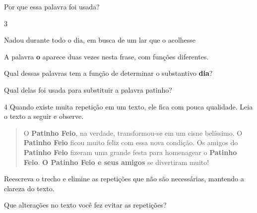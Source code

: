 \begin{escolha}
\begin{escolha}
\begin{escolha}
\item Por que essa palavra foi usada?

\end{escolha}


\num{3}

\begin{mdframed}[linewidth=10pt,linecolor=salmao!20,backgroundcolor=salmao!20,roundcorner=20pt]
Nadou durante todo o dia, em busca de um lar que o acolhesse
\end{mdframed}

A palavra \textbf{o} aparece duas vezes nesta frase, com funções diferentes.

\begin{escolha}
\item Qual dessas palavras tem a função de determinar o substantivo \textbf{dia}?



\item Qual delas foi usada para substituir a palavra patinho?

\end{escolha}


\num{4} Quando existe muita repetição em um texto, ele fica com pouca qualidade.
Leia o texto a seguir e observe.

\begin{quote}
O \textbf{Patinho Feio}, na verdade, transformou-se em um cisne
belíssimo. O \textbf{Patinho Feio} ficou muito feliz com essa nova
condição. Os amigos do \textbf{Patinho Feio} fizeram uma grande festa
para homenagear o \textbf{Patinho Feio}. \textbf{O Patinho Feio e seus
amigos} se divertiram muito!
\end{quote}

\begin{escolha}
\item Reescreva o trecho e elimine as repetições que não são necessárias,
mantendo a clareza do texto.


\item Que alterações no texto você fez evitar as repetições?

\end{escolha}


\end{escolha}
\end{escolha}
